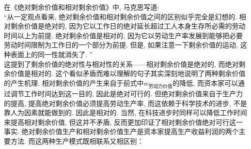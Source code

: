 \documentclass[UTF8,9pt]{ctexart}
\begin{document}
在《绝对剩余价值和相对剩余价值》中, 马克思写道:\\
``从一定观点看来, 绝对剩余价值和相对剩余价值之间的区别似乎完全是幻想的. 相对剩余价值是绝对的, 因为它以工作日的绝对延长超过工人本身生存所必需的劳动时间以上为前提. 绝对剩余价值是相对的, 因为它以劳动生产率发展到能够把必要劳动时间限制为工作日的一个部分为前提. 但是, 如果注意一下剩余价值的运动, 这种表面上的同一性就消失了\cite{title}. ''\\
这提到了剩余价值的绝对性与相对性的关系——相对剩余价值是绝对的, 而绝对剩余价值是相对的. 这个看似矛盾而难以理解的句子其实深刻地说明了两种剩余价值的产生机理. 相对剩余价值的产生来自于前式中$w_{\text{劳动力价值}}$的降低, 而资本家可以通过调节工作时间达到这一目的, 因此是绝对可行的. 但绝对剩余价值来自于生产力的提高, 提高绝对剩余价值必须提高劳动生产率, 而这依赖于科学技术的进步, 不是靠人为因素就能做到的. 因此是相对的. 当然, 在科技进步时同样可以降低工作时间来提高相对剩余价值, 但这并不矛盾, 反而更加印证了相对剩余价值绝对可行这一事实. 
绝对剩余价值生产和相对剩余价值生产是资本家提高生产收益利润的两个主要方法. 而这两种生产模式既相联系又相区别：
\end{document}
